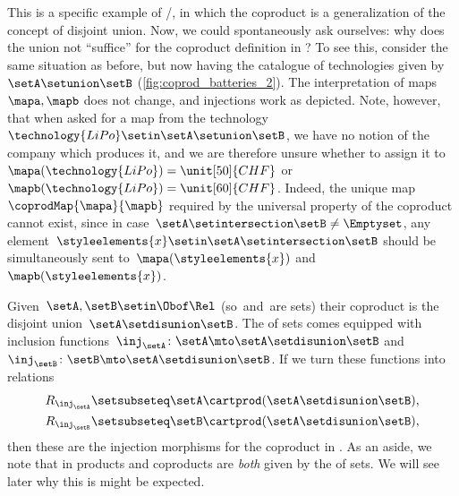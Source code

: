 \begin{example}
    This is a specific example of \Set/\FinSet, in which the coproduct is a generalization of the concept of disjoint union.
    Now, we could spontaneously ask ourselves: why does the union not ``suffice'' for the coproduct definition in \Set?
    To see this, consider the same situation as before, but now having the catalogue of technologies given by~$\setA\setunion \setB$ (\cref{fig:coprod_batteries_2}).
    The interpretation of maps~$\mapa,\mapb$ does not change, and injections work as depicted.
    Note, however, that when asked for a map from the technology~$\technology{LiPo}\setin \setA\setunion \setB$, we have no notion of the company which produces it, and we are therefore unsure whether to assign it to~$\mapa(\technology{LiPo})=\unit[50]{CHF}$ or~$\mapb(\technology{LiPo})=\unit[60]{CHF}$.
    Indeed, the unique map~$\coprodMap{\mapa}{\mapb}$ required by the universal property of the coproduct cannot exist, since in case~$\setA\setintersection \setB\neq \Emptyset$, any element~$\styleelements{x}\setin \setA\setintersection \setB$ should be simultaneously sent to~$\mapa(\styleelements{x})$ and~$\mapb(\styleelements{x})$.
\end{example}


\begin{example}
    Given~$\setA,\setB\setin \Obof\Rel$ (so~\setA and~\setB are sets) their coproduct is the disjoint union~$\setA \setdisunion \setB$.
    The  of sets comes equipped with inclusion functions~$\inj_\setA\colon \setA\mto \setA \setdisunion\setB$ and~$\inj_\setB\colon \setB\mto \setA \setdisunion\setB$.
    If we turn these functions into relations
    \begin{align}
        R_{\inj_\setA} & \setsubseteq \setA\cartprod (\setA \setdisunion\setB), \\
        R_{\inj_\setB} & \setsubseteq \setB\cartprod (\setA \setdisunion\setB),
    \end{align}
    then these are the injection morphisms for the coproduct in \Rel.
    As an aside, we note that in \Rel products and coproducts are \emph{both} given by the  of sets.
    We will see later why this is might be expected.
\end{example}


